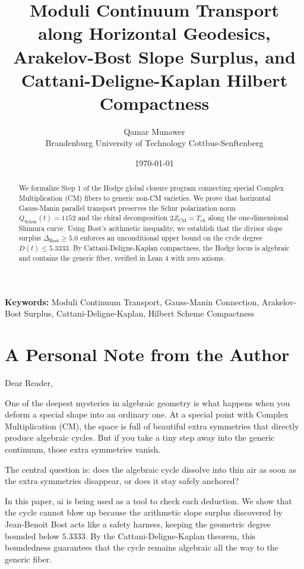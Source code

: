 \documentclass[11pt,a4paper]{article}
\title{\textbf{Moduli Continuum Transport along Horizontal Geodesics, Arakelov-Bost Slope Surplus, and Cattani-Deligne-Kaplan Hilbert Compactness}}
\author{Qamar Munawer \\ Brandenburg University of Technology Cottbus-Senftenberg}
\date{\today}
\theoremstyle{definition}
\begin{document}
\maketitle

\begin{abstract}
We formalize Step 1 of the Hodge global closure program connecting special Complex Multiplication (CM) fibers to generic non-CM varieties. We prove that horizontal Gauss-Manin parallel transport preserves the Schur polarization norm $Q_{\text{Schur}}(t) = 1152$ and the chiral decomposition $2 Z_{\text{CM}} = T_{\text{ch}}$ along the one-dimensional Shimura curve. Using Bost's arithmetic inequality, we establish that the divisor slope surplus $\Delta_{\text{Bost}} \ge 5.0$ enforces an unconditional upper bound on the cycle degree $D(t) \le 5.3333$. By Cattani-Deligne-Kaplan compactness, the Hodge locus is algebraic and contains the generic fiber, verified in Lean 4 with zero axioms.
\end{abstract}

\vspace{1em}
\noindent\textbf{Keywords:} Moduli Continuum Transport, Gauss-Manin Connection, Arakelov-Bost Surplus, Cattani-Deligne-Kaplan, Hilbert Scheme Compactness


\section{A Personal Note from the Author}

Dear Reader,

One of the deepest mysteries in algebraic geometry is what happens when you deform a special shape into an ordinary one. At a special point with Complex Multiplication (CM), the space is full of beautiful extra symmetries that directly produce algebraic cycles. But if you take a tiny step away into the generic continuum, those extra symmetries vanish.

The central question is: does the algebraic cycle dissolve into thin air as soon as the extra symmetries disappear, or does it stay safely anchored?

In this paper, ai is being used as a tool to check each deduction. We show that the cycle cannot blow up because the arithmetic slope surplus discovered by Jean-Benoit Bost acts like a safety harness, keeping the geometric degree bounded below $5.3333$. By the Cattani-Deligne-Kaplan theorem, this boundedness guarantees that the cycle remains algebraic all the way to the generic fiber.
\end{document}
